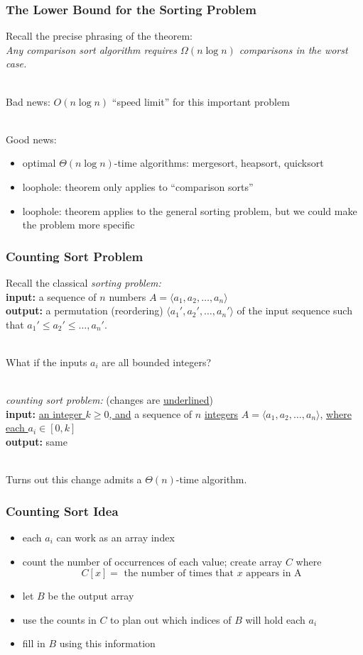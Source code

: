 \documentclass{beamer}
\newcommand{\stanza}{ \\~\ }
\begin{document}
\begin{frame} \frametitle{The Lower Bound for the Sorting Problem}

Recall the precise phrasing of the theorem: \\
\emph{Any comparison sort algorithm requires $\Omega(n \log n)$ comparisons
 in the worst case.} \stanza

Bad news: $O(n \log n)$ ``speed limit'' for this important problem \stanza

Good news:
\begin{itemize}
  \item optimal $\Theta(n \log n)$-time algorithms: mergesort, heapsort, quicksort
  \item loophole: theorem only applies to ``comparison sorts''
  \item loophole: theorem applies to the general sorting problem, but we could
    make the problem more specific
\end{itemize}
\end{frame}

\begin{frame} \frametitle{Counting Sort Problem}
Recall the classical \emph{sorting problem:} \\
\textbf{input:} a sequence of $n$ numbers $A=\langle a_1, a_2, \ldots, a_n \rangle$ \\
\textbf{output:} a permutation (reordering) $\langle a_1', a_2', \ldots, a_n' \rangle$
  of the input sequence such that $a_1' \leq a_2' \leq \ldots, a_n'.$ \stanza

What if the inputs $a_i$ are all bounded integers? \stanza

\emph{counting sort problem:} (changes are \underline{underlined}) \\
\textbf{input:} \underline{an integer $k \geq 0$, and}
  a sequence of $n$ \underline{integers} $A=\langle a_1, a_2, \ldots, a_n \rangle$,
  \underline{where each $a_i \in [0, k]$} \\
\textbf{output:} same \stanza

Turns out this change admits a $\Theta(n)$-time algorithm.
\end{frame}

\begin{frame} \frametitle{Counting Sort Idea}
\begin{itemize}
  \item each $a_i$ can work as an array index
  \item count the number of occurrences of each value; create array $C$ where
    \[ C[x] = \text{ the number of times that } x \text{ appears in A } \]
  \item let $B$ be the output array
  \item use the counts in $C$ to plan out which indices of $B$ will hold each $a_i$
  \item fill in $B$ using this information
\end{itemize}
\end{frame}
\end{document}
